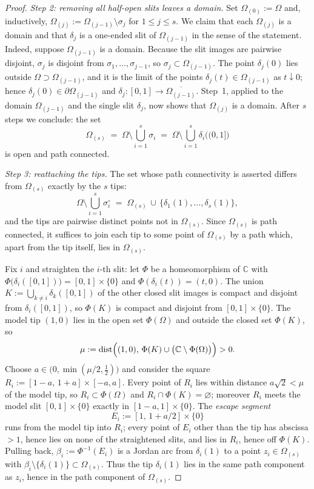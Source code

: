 \documentclass[11pt,reqno]{amsart}
\theoremstyle{definition}
\theoremstyle{remark}
\newcommand{\C}{\mathbb C}
\newcommand{\dist}{\operatorname{dist}}
\begin{document}
\begin{proof}
\emph{Step 2: removing all half-open slits leaves a domain.}
Set $\Omega_{(0)}:=\Omega$ and, inductively,
$\Omega_{(j)}:=\Omega_{(j-1)}\setminus\sigma_j$ for $1\le j\le s$. We claim that each
$\Omega_{(j)}$ is a domain and that $\delta_j$ is a one-ended slit of $\Omega_{(j-1)}$
in the sense of the statement. Indeed, suppose $\Omega_{(j-1)}$ is a domain. Because the
slit images are pairwise disjoint, $\sigma_j$ is disjoint from
$\sigma_1,\dots,\sigma_{j-1}$, so $\sigma_j\subset\Omega_{(j-1)}$. The point
$\delta_j(0)$ lies outside $\Omega\supset\Omega_{(j-1)}$, and it is the limit of the
points $\delta_j(t)\in\Omega_{(j-1)}$ as $t\downarrow0$; hence
$\delta_j(0)\in\partial\Omega_{(j-1)}$ and
$\delta_j\colon[0,1]\to\overline{\Omega_{(j-1)}}$. Step~1, applied to the domain
$\Omega_{(j-1)}$ and the single slit $\delta_j$, now shows that $\Omega_{(j)}$ is a
domain. After $s$ steps we conclude: the set
\[
\Omega_{(s)}\;=\;\Omega\setminus\bigcup_{i=1}^{s}\sigma_i
\;=\;\Omega\setminus\bigcup_{i=1}^{s}\delta_i\bigl((0,1]\bigr)
\]
is open and path connected.

\emph{Step 3: reattaching the tips.}
The set whose path connectivity is asserted differs from $\Omega_{(s)}$ exactly by the
$s$ tips:
\[
\Omega\setminus\bigcup_{i=1}^{s}\sigma_i^{\circ}
\;=\;\Omega_{(s)}\,\cup\,\{\delta_1(1),\dots,\delta_s(1)\},
\]
and the tips are pairwise distinct points not in $\Omega_{(s)}$. Since $\Omega_{(s)}$ is
path connected, it suffices to join each tip to some point of $\Omega_{(s)}$ by a path
which, apart from the tip itself, lies in $\Omega_{(s)}$.

Fix $i$ and straighten the $i$-th slit: let $\Phi$ be a homeomorphism of $\C$ with
$\Phi\bigl(\delta_i([0,1])\bigr)=[0,1]\times\{0\}$ and $\Phi(\delta_i(t))=(t,0)$. The
union $K:=\bigcup_{k\neq i}\delta_k([0,1])$ of the other closed slit images is compact
and disjoint from $\delta_i([0,1])$, so $\Phi(K)$ is compact and disjoint from
$[0,1]\times\{0\}$. The model tip $(1,0)$ lies in the open set $\Phi(\Omega)$ and
outside the closed set $\Phi(K)$, so
\[
\mu:=\dist\Bigl((1,0),\,\Phi(K)\cup\bigl(\C\setminus\Phi(\Omega)\bigr)\Bigr)>0 .
\]
Choose $a\in\bigl(0,\min(\mu/2,\tfrac12)\bigr)$ and consider the square
$R_i:=[1-a,\,1+a]\times[-a,a]$. Every point of $R_i$ lies within distance $a\sqrt2<\mu$
of the model tip, so $R_i\subset\Phi(\Omega)$ and $R_i\cap\Phi(K)=\varnothing$; moreover
$R_i$ meets the model slit $[0,1]\times\{0\}$ exactly in $[1-a,1]\times\{0\}$. The
\emph{escape segment}
\[
E_i:=[1,\,1+a/2]\times\{0\}
\]
runs from the model tip into $R_i$; every point of $E_i$ other than the tip has abscissa
$>1$, hence lies on none of the straightened slits, and lies in $R_i$, hence off
$\Phi(K)$. Pulling back, $\beta_i:=\Phi^{-1}(E_i)$ is a Jordan arc from $\delta_i(1)$ to
a point $z_i\in\Omega_{(s)}$ with $\beta_i\setminus\{\delta_i(1)\}\subset\Omega_{(s)}$.
Thus the tip $\delta_i(1)$ lies in the same path component as $z_i$, hence in the path
component of $\Omega_{(s)}$.


\end{proof}
\end{document}
